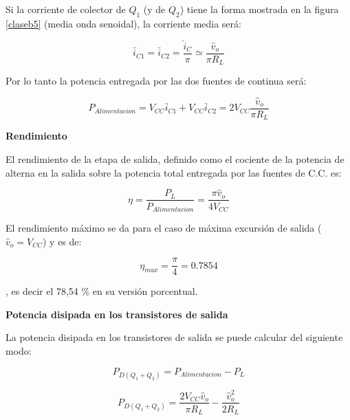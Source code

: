 \bigskip

Si la corriente de colector de $Q_1$ (y de $Q_2$) tiene la forma
mostrada en la figura \ref{claseb5} (media onda senoidal), la
corriente media será:

\begin{equation}
	\bar{i}_{C1}=\bar{i}_{C2}=\frac{\displaystyle \hat{i}_{C}}{\displaystyle \pi} \simeq \frac{\displaystyle \hat{v}_{o}}{\displaystyle \pi R_L}
\end{equation}


Por lo tanto la potencia entregada por las dos fuentes de continua
será:

\begin{equation}
	P_{Alimentacion}=V_{CC}\bar{i}_{C1}+V_{CC}\bar{i}_{C2}=2V_{CC}\frac{\displaystyle \hat{v}_o}{\displaystyle \pi R_L}
\end{equation}

\medskip

\textbf{Rendimiento}

\bigskip

El rendimiento de la etapa de salida, definido como el cociente de
la potencia de alterna en la salida sobre la potencia total
entregada por las fuentes de C.C. es:

\begin{equation}
	\eta=\frac{\displaystyle P_L}{\displaystyle P_{Alimentacion}}=\frac{\displaystyle \pi \hat{v}_{o}}{\displaystyle 4 V_{CC}}
\end{equation}

El rendimiento máximo se da para el caso de máxima excursión de
salida ($\hat{v}_{o}=V_{CC}$) y es de:

\begin{equation}
	\eta_{max}=\frac{\displaystyle \pi}{\displaystyle 4}=0.7854
\end{equation}

, es decir el 78,54 \% en su versión porcentual.

\medskip

\textbf{Potencia disipada en los transistores de salida}

\bigskip

La potencia disipada en los transistores de salida se puede calcular
del siguiente modo:

\begin{equation}
	P_{D(Q_1+Q_2)}=P_{Alimentacion}-P_L
\end{equation}

\begin{equation}
	P_{D(Q_1+Q_2)}=\frac{\displaystyle 2V_{CC}\hat{v}_{o}}{\displaystyle \pi
		R_L}-\frac{\displaystyle \hat{v}_{o}^2}{\displaystyle 2R_L}
\end{equation}

